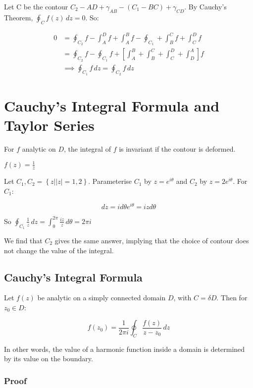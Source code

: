 \documentclass{../../physics_notes}
\begin{document}
Let C be the contour $C_2 - AD + \gamma_{AB} - (C_1 - BC) + \gamma_{CD}$. By Cauchy's Theorem, $\oint_C f(z) \, dz = 0$. So:

\begin{align*}
0 &= \oint_{C_2} f - \int_A^D f + \int_A^B f - \oint_{C_1} + \int_B^C f + \int_C^D f \\
&= \oint_{C_2} f - \oint_{C_1} f + \left[ \int_A^B + \int_B^C + \int_C^D + \int_D^A \right] f \\
&\implies \oint_{C_1} f\,dz = \oint_{C_2} f\,dz
\end{align*}

\section{Cauchy's Integral Formula and Taylor Series}

For $f$ analytic on $D$, the integral of $f$ is invariant if the contour is deformed. 

\begin{example}{$f(z) = \frac{1}{z}$}

Let $C_1, C_2 = \left\{ z \rvert |z| = 1,2\right\}$. Parameterise $C_1$ by $z = e^{i\theta}$ and $C_2$ by $z = 2e^{i\theta}$. For $C_1$:

\[ dz = id\theta e^{i\theta} = izd\theta \]

So $\oint_{C_1} \frac{1}{z} \, dz = \int_0^{2\pi} \frac{iz}{z} \, d\theta = 2\pi i$

\end{example}

We find that $C_2$ gives the same answer, implying that the choice of contour does not change the value of the integral. 

\subsection{Cauchy's Integral Formula }

Let $f(z)$ be analytic on a simply connected domain $D$, with $C = \delta D$. Then for $z_0 \in D$:

\[ f(z_0) = \frac{1}{2\pi i} \oint_C \frac{f(z)}{z - z_0} \, dz \]

In other words, the value of a harmonic function inside a domain is determined by its value on the boundary. 

\subsubsection*{Proof}
\end{document}
